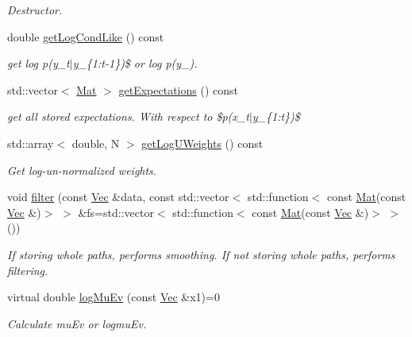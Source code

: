 \begin{DoxyCompactItemize}
\begin{DoxyCompactList}\small\item\em Destructor. \end{DoxyCompactList}\item 
double \hyperlink{classSISRFilter_a8746d574a3d6703f62400fd5075460eb}{get\+Log\+Cond\+Like} () const 
\begin{DoxyCompactList}\small\item\em get log p(y\+\_\+t$\vert$y\+\_\+\{1\+:t-\/1\})\$ or log p(y\+\_). \end{DoxyCompactList}\item 
std\+::vector$<$ \hyperlink{apf__filter_8h_ae601f56a556993079f730483c574356f}{Mat} $>$ \hyperlink{classSISRFilter_a8025ce575c95fa0cc19790d15938ce84}{get\+Expectations} () const 
\begin{DoxyCompactList}\small\item\em get all stored expectations. With respect to \$p(x\+\_\+t$\vert$y\+\_\+\{1\+:t\})\$ \end{DoxyCompactList}\item 
std\+::array$<$ double, N $>$ \hyperlink{classSISRFilter_aa64190570abd4e589dc8724816fc5986}{get\+Log\+U\+Weights} () const 
\begin{DoxyCompactList}\small\item\em Get log-\/un-\/normalized weights. \end{DoxyCompactList}\item 
void \hyperlink{classSISRFilter_a3523d82ca4e53ce8b4e5d0cc5c252ca1}{filter} (const \hyperlink{apf__filter_8h_a4c7df05c6f5e8a0d15ae14bcdbc07152}{Vec} \&data, const std\+::vector$<$ std\+::function$<$ const \hyperlink{apf__filter_8h_ae601f56a556993079f730483c574356f}{Mat}(const \hyperlink{apf__filter_8h_a4c7df05c6f5e8a0d15ae14bcdbc07152}{Vec} \&)$>$ $>$ \&fs=std\+::vector$<$ std\+::function$<$ const \hyperlink{apf__filter_8h_ae601f56a556993079f730483c574356f}{Mat}(const \hyperlink{apf__filter_8h_a4c7df05c6f5e8a0d15ae14bcdbc07152}{Vec} \&)$>$ $>$())
\begin{DoxyCompactList}\small\item\em If storing whole paths, performs smoothing. If not storing whole paths, performs filtering. \end{DoxyCompactList}\item 
virtual double \hyperlink{classSISRFilter_a793a791dca7b2c3a4d73365774613d27}{log\+Mu\+Ev} (const \hyperlink{apf__filter_8h_a4c7df05c6f5e8a0d15ae14bcdbc07152}{Vec} \&x1)=0
\begin{DoxyCompactList}\small\item\em Calculate mu\+Ev or logmu\+Ev. \end{DoxyCompactList}\item 

\end{DoxyCompactItemize}
